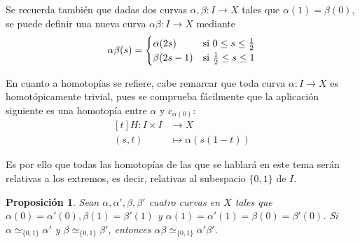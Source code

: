 \documentclass[11pt]{report}
\newenvironment{cproposition} %
  {\begin{mdframed}[innertopmargin = 0pt,
                    innerbottommargin = 7.5pt,
                    backgroundcolor = lightgray!10,
                    linewidth = 1pt,
                    shadow = true,
                    shadowsize = 5pt,
                    roundcorner = 0pt,
                    skipabove = 0pt]
    \begin{proposition}}
  {\end{proposition}\end{mdframed}}
\newtheorem{proposition}{Proposición}[chapter]
\theoremstyle{definition}
\theoremstyle{definition}
\theoremstyle{remark}
\begin{document}
Se recuerda también que dadas dos curvas $\alpha, \beta \colon I \to X$ tales que $\alpha(1) = \beta(0)$, se puede definir una nueva curva $\alpha \beta \colon I \to X$ mediante
\[
\alpha \beta (s) = \begin{cases}
    \alpha(2s) & $si$ \ 0 \leq s \leq \frac{1}{2} \\
    \beta(2s-1) & $si$ \ \frac{1}{2} \leq s \leq 1
\end{cases}
\]

En cuanto a homotopías se refiere, cabe remarcar que toda curva $\alpha \colon I \to X$ es homotópicamente trivial, pues se comprueba fácilmente que la aplicación siguiente es una homotopía entre $\alpha$ y $c_{\alpha(0)}$:
\[\begin{aligned}[t]
    H \colon I \times I &\longrightarrow X \\
    (s,t) &\longmapsto \alpha(s(1-t))
\end{aligned}\]

Es por ello que todas las homotopías de las que se hablará en este tema serán relativas a los extremos, es decir, relativas al subespacio $\{0,1\}$ de $I$.

\hfill

\begin{cproposition}
\label{prop2.1.}
Sean $\alpha, \alpha', \beta, \beta'$ cuatro curvas en $X$ tales que $\alpha(0) = \alpha'(0), \beta(1) = \beta'(1)$ y $\alpha(1)=\alpha'(1)=\beta(0)=\beta'(0)$. Si $\alpha \simeq_{\{0,1\}} \alpha'$ y $\beta \simeq_{\{0,1\}} \beta'$, entonces $\alpha\beta \simeq_{\{0,1\}} \alpha'\beta'$.
\end{cproposition}
\end{document}

